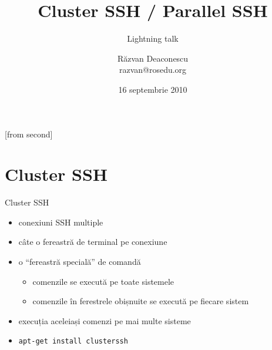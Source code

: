 \documentclass{beamer}
\title[Cluster SSH / Parallel SSH]{Cluster SSH / Parallel SSH}
\subtitle{Lightning talk}
\institute{Întâlnirile lunare RLUG -- Septembrie 2010}
\author[Răzvan Deaconescu]{Răzvan Deaconescu\\
	razvan@rosedu.org}
\date{16 septembrie 2010}
\begin{document}
[from second]


\frame{\titlepage}

\section{Cluster SSH}

\frame{\tableofcontents[currentsection]}

\begin{frame}{Cluster SSH}
	\begin{itemize}		%
		\item conexiuni SSH multiple
		\item câte o fereastră de terminal pe conexiune
		\item o ``fereastră specială'' de comandă
			\begin{itemize}
				\item comenzile se execută pe toate sistemele
				\item comenzile în ferestrele obișnuite se execută pe fiecare
				sistem
			\end{itemize}
		\item execuția aceleiași comenzi pe mai multe sisteme
		\item \texttt{apt-get install clusterssh}
	\end{itemize}
\end{frame}
\end{document}
